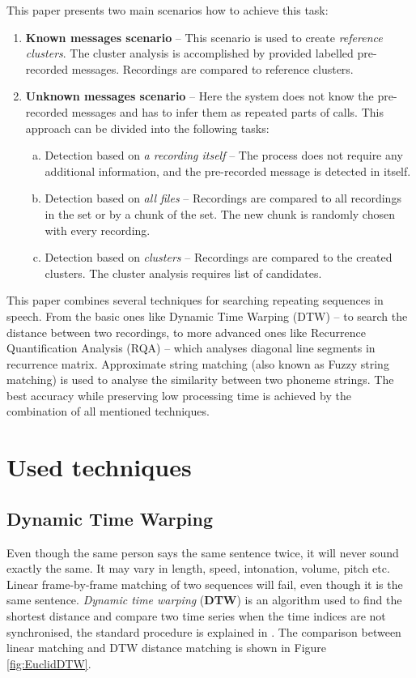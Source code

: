 \documentclass{ExcelAtFIT}
\begin{document}
This paper presents two main scenarios how to achieve this task:
\label{intro}
\begin{enumerate}
    \item \textbf{Known messages scenario} -- This scenario is used to create \textit{reference clusters}. The cluster analysis is accomplished by provided labelled pre-recorded messages. Recordings are compared to reference clusters. 

\label{knownmessages}
    \item \textbf{Unknown messages scenario} -- Here the system does not know the pre-recorded messages and has to infer them as repeated parts of calls. This approach can be divided into the following tasks:
\label{unknownmessages}
    \begin{enumerate}[a)]
        \item Detection based on \textit{a recording itself} -- The process does not require any additional information, and the pre-recorded message is detected in itself. 

        \item Detection based on \textit{all files} -- Recordings are compared to all recordings in the set or by a chunk of the set. The new chunk is randomly chosen with every recording. 
    
        \item Detection based on \textit{clusters} -- Recordings are compared to the created clusters. The cluster analysis requires list of candidates. 
    \end{enumerate}
\end{enumerate}


This paper combines several techniques for searching repeating sequences in speech. From the basic ones like Dynamic Time Warping (DTW) -- to search the distance between two recordings, to more advanced ones like Recurrence Quantification Analysis (RQA) -- which analyses diagonal line segments in recurrence matrix. Approximate string matching (also known as Fuzzy string matching) is used to analyse the similarity between two phoneme strings. The best accuracy while preserving low processing time is achieved by the combination of all mentioned techniques.


\section{Used techniques}
\subsection{Dynamic Time Warping}
Even though the same person says the same sentence twice, it will never sound exactly the same. It may vary in length, speed, intonation, volume, pitch etc. Linear frame-by-frame matching of two sequences will fail, even though it is the same sentence. \textit{Dynamic time warping} (\textbf{DTW}) is an algorithm used to find the shortest distance and compare two time series when the time indices are not synchronised, the standard procedure is explained in \cite{MFCCDTW}. The comparison between linear matching and DTW distance matching is shown in Figure \ref{fig:EuclidDTW}. 
\end{document}
